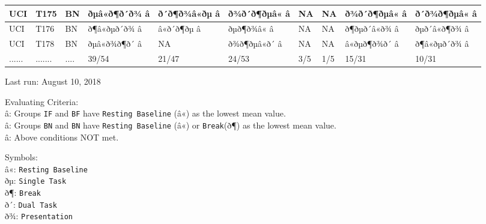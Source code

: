 \documentclass[]{article}
\begin{document}
\begin{table}[H]
\begin{tabular}{l|l|l|l|l|l|l|l|l|l}
\hline
UCI & T175 & BN & ðµâ«ð¶ð´ð¾ â & ð´ð¶ð¾â«ðµ â & ð¾ð´ð¶ðµâ« â & NA & NA & ð¾ð´ð¶ðµâ« â & ð´ð¾ð¶ðµâ« â\\
\hline
UCI & T176 & BN & ð¶â«ðµð´ð¾ â & â«ð´ð¶ðµ â & ðµð¶ð¾â« â & NA & NA & ð¶ðµð´â«ð¾ â & ðµð´â«ð¶ð¾ â\\
\hline
UCI & T178 & BN & ðµâ«ð¾ð¶ð´ â & NA & ð¾ð¶ðµâ«ð´ â & NA & NA & â«ðµð¶ð¾ð´ â & ð¶â«ðµð´ð¾ â\\
\hline
...... & ....... & .... & 39/54 & 21/47 & 24/53 & 3/5 & 1/5 & 15/31 & 10/31\\
\hline
\end{tabular}\endgroup{}
\end{table}

Last run: August 10, 2018

Evaluating Criteria:\\
â: Groups \texttt{IF} and \texttt{BF} have \texttt{Resting\ Baseline}
(â«) as the lowest mean value.\\
â: Groups \texttt{BN} and \texttt{BN} have \texttt{Resting\ Baseline}
(â«) or \texttt{Break}(ð¶) as the lowest mean value.\\
â: Above conditions NOT met.

Symbols:\\
â«: \texttt{Resting\ Baseline}\\
ðµ: \texttt{Single\ Task}\\
ð¶: \texttt{Break}\\
ð´: \texttt{Dual\ Task}\\
ð¾: \texttt{Presentation}
\end{document}
